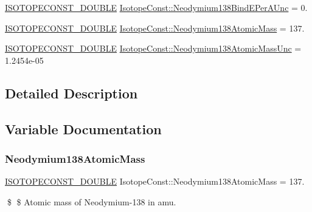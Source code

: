 \begin{DoxyCompactItemize}
\mbox{\hyperlink{group___isotope_const-_macros_ga8f45a7272ce02c0b4c65c44636ed719a}{I\+S\+O\+T\+O\+P\+E\+C\+O\+N\+S\+T\+\_\+\+D\+O\+U\+B\+LE}} \mbox{\hyperlink{group___isotope_const-_neodymium-_nd138_ga558e52135f2eec256a53b4ef5c838b9f}{Isotope\+Const\+::\+Neodymium138\+Bind\+E\+Per\+A\+Unc}} = 0.
\item 
\mbox{\hyperlink{group___isotope_const-_macros_ga8f45a7272ce02c0b4c65c44636ed719a}{I\+S\+O\+T\+O\+P\+E\+C\+O\+N\+S\+T\+\_\+\+D\+O\+U\+B\+LE}} \mbox{\hyperlink{group___isotope_const-_neodymium-_nd138_ga6ba894ebfc72fc723a4a31d31ec9a58a}{Isotope\+Const\+::\+Neodymium138\+Atomic\+Mass}} = 137.
\item 
\mbox{\hyperlink{group___isotope_const-_macros_ga8f45a7272ce02c0b4c65c44636ed719a}{I\+S\+O\+T\+O\+P\+E\+C\+O\+N\+S\+T\+\_\+\+D\+O\+U\+B\+LE}} \mbox{\hyperlink{group___isotope_const-_neodymium-_nd138_ga3bf938473ab907664bcdeb405c9048fb}{Isotope\+Const\+::\+Neodymium138\+Atomic\+Mass\+Unc}} = 1.\+2454e-\/05
\end{DoxyCompactItemize}


\subsection{Detailed Description}


\subsection{Variable Documentation}
\mbox{\label{group___isotope_const-_neodymium-_nd138_ga6ba894ebfc72fc723a4a31d31ec9a58a}} 
\subsubsection{\texorpdfstring{Neodymium138\+Atomic\+Mass}{Neodymium138AtomicMass}}
{\footnotesize\ttfamily \mbox{\hyperlink{group___isotope_const-_macros_ga8f45a7272ce02c0b4c65c44636ed719a}{I\+S\+O\+T\+O\+P\+E\+C\+O\+N\+S\+T\+\_\+\+D\+O\+U\+B\+LE}} Isotope\+Const\+::\+Neodymium138\+Atomic\+Mass = 137.}

\$ \$ Atomic mass of Neodymium-\/138 in amu. \mbox{\label{group___isotope_const-_neodymium-_nd138_ga3bf938473ab907664bcdeb405c9048fb}} 
